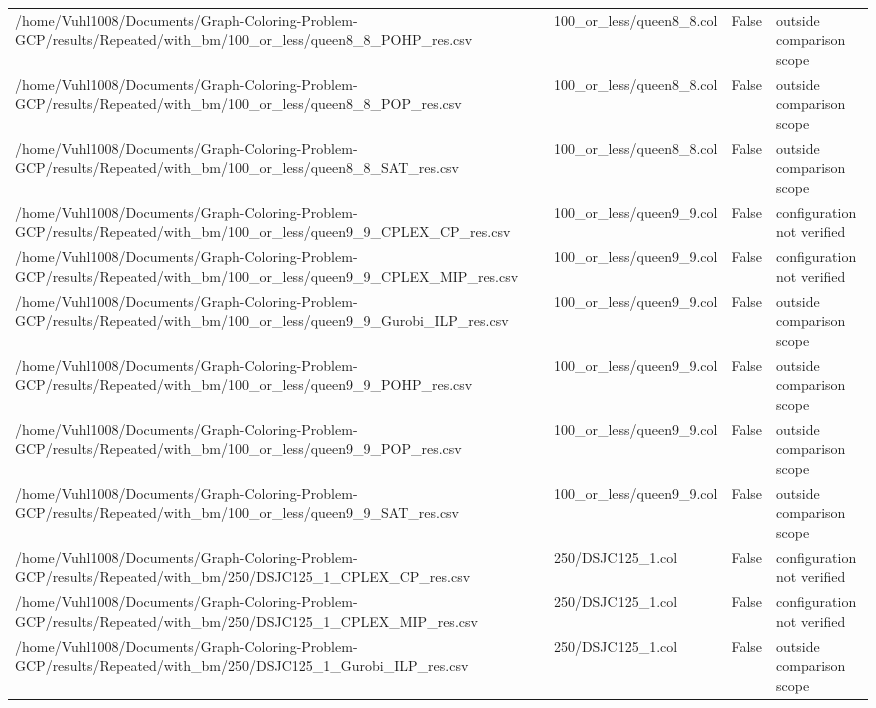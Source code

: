 \begin{table}[htbp]
\begin{tabular}{llll}
/home/Vuhl1008/Documents/Graph-Coloring-Problem-GCP/results/Repeated/with\_bm/100\_or\_less/queen8\_8\_POHP\_res.csv & 100\_or\_less/queen8\_8.col & False & outside comparison scope \\
/home/Vuhl1008/Documents/Graph-Coloring-Problem-GCP/results/Repeated/with\_bm/100\_or\_less/queen8\_8\_POP\_res.csv & 100\_or\_less/queen8\_8.col & False & outside comparison scope \\
/home/Vuhl1008/Documents/Graph-Coloring-Problem-GCP/results/Repeated/with\_bm/100\_or\_less/queen8\_8\_SAT\_res.csv & 100\_or\_less/queen8\_8.col & False & outside comparison scope \\
/home/Vuhl1008/Documents/Graph-Coloring-Problem-GCP/results/Repeated/with\_bm/100\_or\_less/queen9\_9\_CPLEX\_CP\_res.csv & 100\_or\_less/queen9\_9.col & False & configuration not verified \\
/home/Vuhl1008/Documents/Graph-Coloring-Problem-GCP/results/Repeated/with\_bm/100\_or\_less/queen9\_9\_CPLEX\_MIP\_res.csv & 100\_or\_less/queen9\_9.col & False & configuration not verified \\
/home/Vuhl1008/Documents/Graph-Coloring-Problem-GCP/results/Repeated/with\_bm/100\_or\_less/queen9\_9\_Gurobi\_ILP\_res.csv & 100\_or\_less/queen9\_9.col & False & outside comparison scope \\
/home/Vuhl1008/Documents/Graph-Coloring-Problem-GCP/results/Repeated/with\_bm/100\_or\_less/queen9\_9\_POHP\_res.csv & 100\_or\_less/queen9\_9.col & False & outside comparison scope \\
/home/Vuhl1008/Documents/Graph-Coloring-Problem-GCP/results/Repeated/with\_bm/100\_or\_less/queen9\_9\_POP\_res.csv & 100\_or\_less/queen9\_9.col & False & outside comparison scope \\
/home/Vuhl1008/Documents/Graph-Coloring-Problem-GCP/results/Repeated/with\_bm/100\_or\_less/queen9\_9\_SAT\_res.csv & 100\_or\_less/queen9\_9.col & False & outside comparison scope \\
/home/Vuhl1008/Documents/Graph-Coloring-Problem-GCP/results/Repeated/with\_bm/250/DSJC125\_1\_CPLEX\_CP\_res.csv & 250/DSJC125\_1.col & False & configuration not verified \\
/home/Vuhl1008/Documents/Graph-Coloring-Problem-GCP/results/Repeated/with\_bm/250/DSJC125\_1\_CPLEX\_MIP\_res.csv & 250/DSJC125\_1.col & False & configuration not verified \\
/home/Vuhl1008/Documents/Graph-Coloring-Problem-GCP/results/Repeated/with\_bm/250/DSJC125\_1\_Gurobi\_ILP\_res.csv & 250/DSJC125\_1.col & False & outside comparison scope \\

\end{tabular}
\end{table}
